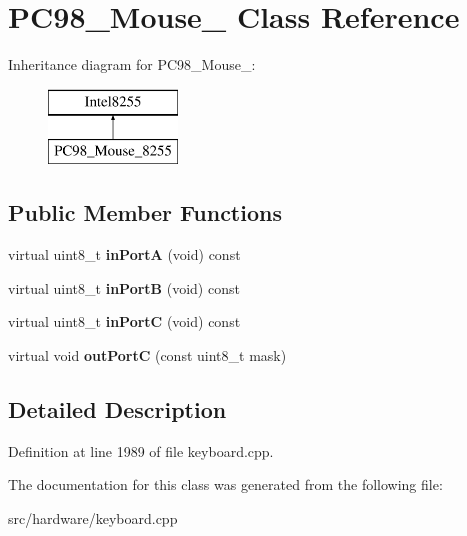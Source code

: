\hypertarget{classPC98__Mouse__8255}{\section{P\-C98\-\_\-\-Mouse\-\_ Class Reference}
\label{classPC98__Mouse__8255}
}
Inheritance diagram for P\-C98\-\_\-\-Mouse\-\_\-:\begin{figure}[H]
\begin{center}
\leavevmode
\includegraphics[height=2.000000cm]{classPC98__Mouse__8255}
\end{center}
\end{figure}
\subsection*{Public Member Functions}
\begin{DoxyCompactItemize}
\item 
\hypertarget{classPC98__Mouse__8255_ae7643f0d9646d6aac477f26fbf6132a4}{virtual uint8\-\_\-t {\bfseries in\-Port\-A} (void) const }\label{classPC98__Mouse__8255_ae7643f0d9646d6aac477f26fbf6132a4}

\item 
\hypertarget{classPC98__Mouse__8255_a62483e81d5fad011aaaca35aeee59308}{virtual uint8\-\_\-t {\bfseries in\-Port\-B} (void) const }\label{classPC98__Mouse__8255_a62483e81d5fad011aaaca35aeee59308}

\item 
\hypertarget{classPC98__Mouse__8255_aa65cf202bb7b8c59cd7911aeddf9f2bd}{virtual uint8\-\_\-t {\bfseries in\-Port\-C} (void) const }\label{classPC98__Mouse__8255_aa65cf202bb7b8c59cd7911aeddf9f2bd}

\item 
\hypertarget{classPC98__Mouse__8255_af64ccdbfb0d8eff0711088b3de6b4949}{virtual void {\bfseries out\-Port\-C} (const uint8\-\_\-t mask)}\label{classPC98__Mouse__8255_af64ccdbfb0d8eff0711088b3de6b4949}

\end{DoxyCompactItemize}


\subsection{Detailed Description}


Definition at line 1989 of file keyboard.\-cpp.



The documentation for this class was generated from the following file\-:\begin{DoxyCompactItemize}
\item 
src/hardware/keyboard.\-cpp\end{DoxyCompactItemize}
